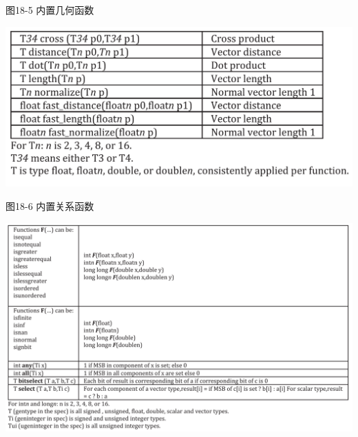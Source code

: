 \hspace*{\fill} \par %
图18-5 内置几何函数
\begin{center}
	\includegraphics[width=1.0\textwidth]{content/chapter-18/images/5}
\end{center}

\hspace*{\fill} \par %
图18-6 内置关系函数
\begin{center}
	\includegraphics[width=1.0\textwidth]{content/chapter-18/images/6}
\end{center}




























































